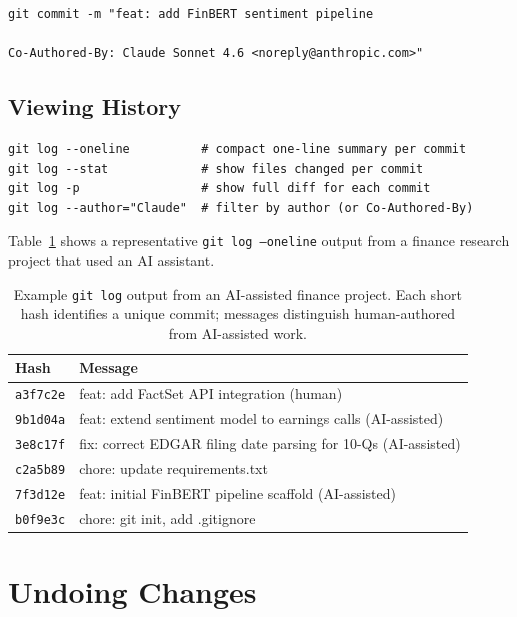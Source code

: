 \begin{verbatim}
git commit -m "feat: add FinBERT sentiment pipeline

Co-Authored-By: Claude Sonnet 4.6 <noreply@anthropic.com>"
\end{verbatim}

\subsection{Viewing History}
\label{app:git:log}

\begin{verbatim}
git log --oneline          # compact one-line summary per commit
git log --stat             # show files changed per commit
git log -p                 # show full diff for each commit
git log --author="Claude"  # filter by author (or Co-Authored-By)
\end{verbatim}

Table~\ref{tab:git-log-example} shows a representative \texttt{git log --oneline}
output from a finance research project that used an AI assistant.

\begin{table}[ht]
\centering
\caption{Example \texttt{git log} output from an AI-assisted finance project.
Each short hash identifies a unique commit; messages distinguish human-authored
from AI-assisted work.}
\label{tab:git-log-example}
\begin{tabular}{ll}
\toprule
Hash    & Message \\
\midrule
\texttt{a3f7c2e} & feat: add FactSet API integration (human) \\
\texttt{9b1d04a} & feat: extend sentiment model to earnings calls (AI-assisted) \\
\texttt{3e8c17f} & fix: correct EDGAR filing date parsing for 10-Qs (AI-assisted) \\
\texttt{c2a5b89} & chore: update requirements.txt \\
\texttt{7f3d12e} & feat: initial FinBERT pipeline scaffold (AI-assisted) \\
\texttt{b0f9e3c} & chore: git init, add .gitignore \\
\bottomrule
\end{tabular}
\end{table}

\section{Undoing Changes}
\label{app:git:undo}

